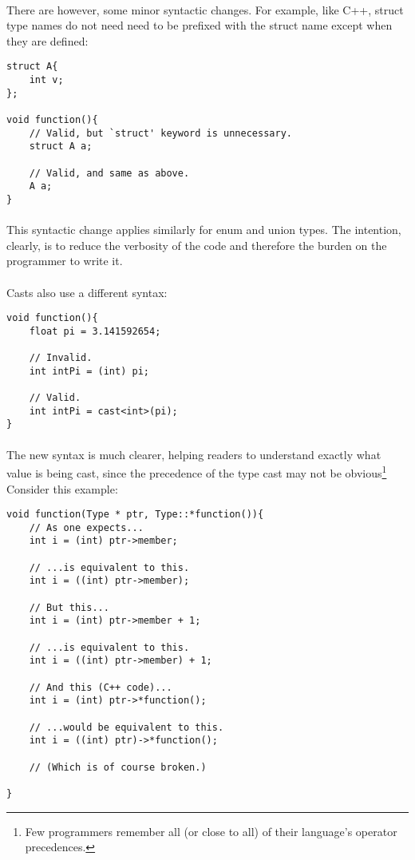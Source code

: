 \documentclass[12pt,twoside,notitlepage]{report}
\begin{document}
\paragraph{}
There are however, some minor syntactic changes. For example, like C++, struct type names do not need need to be prefixed with the struct name except when they are defined:

\begin{lstlisting}
struct A{
	int v;
};

void function(){
	// Valid, but `struct' keyword is unnecessary.
	struct A a;
	
	// Valid, and same as above.
	A a;
}
\end{lstlisting}

\paragraph{}
This syntactic change applies similarly for enum and union types. The intention, clearly, is to reduce the verbosity of the code and therefore the burden on the programmer to write it.

\paragraph{}
Casts also use a different syntax:

\begin{lstlisting}
void function(){
	float pi = 3.141592654;
	
	// Invalid.
	int intPi = (int) pi;
	
	// Valid.
	int intPi = cast<int>(pi);
}
\end{lstlisting}

\paragraph{}
The new syntax is much clearer, helping readers to understand exactly what value is being cast, since the precedence of the type cast may not be obvious\footnote{Few programmers remember all (or close to all) of their language's operator precedences.} Consider this example:

\begin{lstlisting}
void function(Type * ptr, Type::*function()){
	// As one expects...
	int i = (int) ptr->member;
	
	// ...is equivalent to this.
	int i = ((int) ptr->member);
	
	// But this...
	int i = (int) ptr->member + 1;
	
	// ...is equivalent to this.
	int i = ((int) ptr->member) + 1;
	
	// And this (C++ code)...
	int i = (int) ptr->*function();
	
	// ...would be equivalent to this.
	int i = ((int) ptr)->*function();
	
	// (Which is of course broken.)
	
}
\end{lstlisting}
\end{document}
